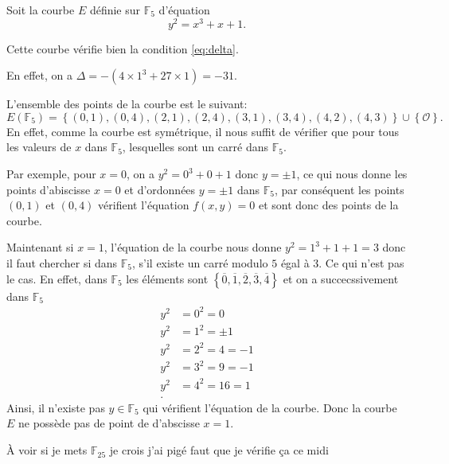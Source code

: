 \begin{exemple}
    Soit la courbe $E$ définie sur $\mathbb{F}_{5}$ d'équation
    \[
    y^2 =x^3+x+1
    .\] 

    Cette courbe vérifie bien la condition \eqref{eq:delta}.
    
    En effet, on a $\Delta = -(4 \times 1^3 + 27 \times 1) = -31$.

    L'ensemble des points de la courbe est le suivant:
    \[
    E(\mathbb{F}_{5})= \left\{ (0,1),(0,4),(2,1),(2,4),(3,1),(3,4),(4,2),(4,3) \right\} \cup
    \left\{ \mathcal{O} \right\} 
    .\] 
    En effet, comme la courbe est symétrique, il nous suffit de vérifier que pour tous les
    valeurs de $x$ dans $\mathbb{F}_{5}$, lesquelles sont un carré dans $\mathbb{F}_{5}$.

    Par exemple, pour $x=0$, on a $y^2=0^3+0+1$ donc $y = \pm 1$, ce qui nous donne
    les points d'abiscisse $x=0$ et d'ordonnées $y=\pm 1$ dans $\mathbb{F}_{5}$, par
    conséquent les points $(0,1)$ et $(0,4)$ vérifient l'équation $f(x,y) = 0$ et sont
    donc des points de la courbe.

    Maintenant si $x=1$, l'équation de la courbe nous donne $y^2=1^3+1+1=3$ donc il faut
    chercher si dans $\mathbb{F}_{5}$, s'il existe un carré modulo $5$ égal à 3. Ce qui n'est
    pas le cas. En effet, dans $\mathbb{F}_{5}$ les éléments sont $\left\{
    \overline{0},\overline{1},\overline{2},\overline{3},\overline{4} \right\} $ et on a
    succecssivement dans $\mathbb{F}_{5}$
    \begin{align*}
        y^2 &=0^2=0 \\
        y^2 &= 1^2 = \pm 1 \\
        y^2 &= 2^2=4=-1 \\
        y^2 &= 3^2=9=-1 \\
        y^2 &= 4^2=16=1 \\
    .\end{align*}
    Ainsi, il n'existe pas $y \in \mathbb{F}_{5}$ qui vérifient l'équation de la
    courbe. Donc la courbe $E$ ne possède pas de point de d'abscisse $x=1$.

    À voir si je mets $\mathbb{F}_{25}$ je crois j'ai pigé faut que je vérifie ça ce midi
\end{exemple}
